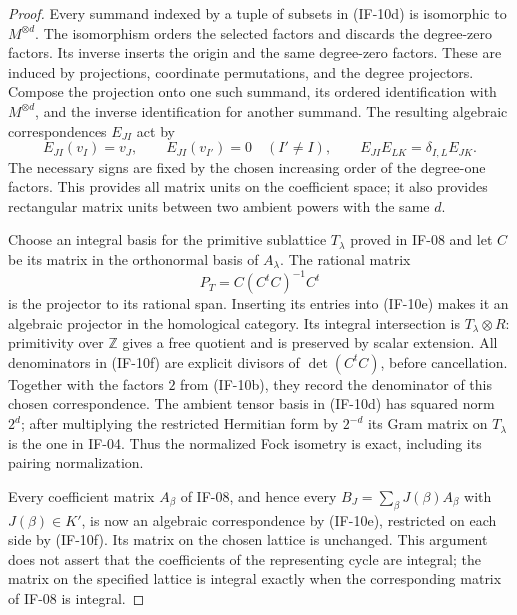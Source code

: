 \begin{proof}
Every summand indexed by a tuple of subsets in (IF-10d) is isomorphic
to $M^{\otimes d}$. The isomorphism orders the selected factors and
discards the degree-zero factors. Its inverse inserts the origin and
the same degree-zero factors. These are induced by projections,
coordinate permutations, and the degree projectors. Compose the
projection onto one such summand, its ordered identification with
$M^{\otimes d}$, and the inverse identification for another summand.
The resulting algebraic correspondences $E_{JI}$ act by
\[
 E_{JI}(v_I)=v_J,\qquad E_{JI}(v_{I'})=0\quad(I'\ne I),
 \qquad E_{JI}E_{LK}=\delta_{I,L}E_{JK}.           \tag{IF-10e}
\]
The necessary signs are fixed by the chosen increasing order of the
degree-one factors. This provides all matrix units on the coefficient
space; it also provides rectangular matrix units between two ambient
powers with the same $d$.

Choose an integral basis for the primitive sublattice $T_\lambda$
proved in IF-08 and let $C$ be its matrix in the orthonormal basis of
$A_\lambda$. The rational matrix
\[
 P_T=C(C^tC)^{-1}C^t                              \tag{IF-10f}
\]
is the projector to its rational span. Inserting its entries into
(IF-10e) makes it an algebraic projector in the homological category.
Its integral intersection is $T_\lambda\otimes R$: primitivity over
$\mathbb Z$ gives a free quotient and is preserved by scalar extension.
All denominators in (IF-10f) are explicit divisors of
$\det(C^tC)$, before cancellation. Together with the factors $2$ from
(IF-10b), they record the denominator of this chosen correspondence.
The ambient tensor basis in (IF-10d) has squared norm $2^d$; after
multiplying the restricted Hermitian form by $2^{-d}$ its Gram matrix
on $T_\lambda$ is the one in IF-04. Thus the normalized Fock isometry
is exact, including its pairing normalization.

Every coefficient matrix $A_\beta$ of IF-08, and hence every
$B_J=\sum_\beta J(\beta)A_\beta$ with $J(\beta)\in K'$, is now an
algebraic correspondence by (IF-10e), restricted on each side by
(IF-10f). Its matrix on the chosen lattice is unchanged. This argument
does not assert that the coefficients of the representing cycle are
integral; the matrix on the specified lattice is integral exactly
when the corresponding matrix of IF-08 is integral.


\end{proof}
